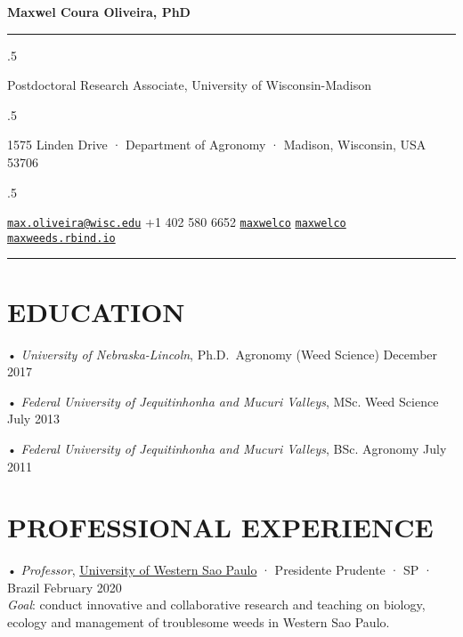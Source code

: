 \documentclass[11pt,]{article}
\begin{document}
\centerline{\huge \bf Maxwel Coura Oliveira, PhD}

\vspace{2 mm}

\hrule

\vspace{2 mm}

\moveleft.5\hoffset\centerline{Postdoctoral Research Associate, University of Wisconsin-Madison}
\moveleft.5\hoffset\centerline{1575 Linden Drive · Department of Agronomy · Madison, Wisconsin, USA
53706}
\moveleft.5\hoffset\centerline{ \faEnvelopeO \hspace{1 mm} \href{mailto:}{\tt \href{mailto:max.oliveira@wisc.edu}{\nolinkurl{max.oliveira@wisc.edu}}} \hspace{1 mm}  \faPhone \hspace{1 mm}  +1 402 580 6652  \hspace{1 mm}  \faGithub \hspace{1 mm} \href{http://github.com/maxwelco}{\tt maxwelco} \hspace{1 mm}   \faTwitter \hspace{1 mm} \href{https:/twitter.com/maxwelco}{\tt maxwelco} \hspace{1 mm}  \faGlobe \hspace{1 mm} \href{http://maxweeds.rbind.io}{\tt maxweeds.rbind.io}   }

\vspace{2 mm}

\hrule


\hypertarget{education}{%
\section{EDUCATION}\label{education}}

• \emph{University of Nebraska-Lincoln}, Ph.D.~Agronomy (Weed Science)
\hfill December 2017

• \emph{Federal University of Jequitinhonha and Mucuri Valleys}, MSc.
Weed Science \hfill July 2013

• \emph{Federal University of Jequitinhonha and Mucuri Valleys}, BSc.
Agronomy \hfill July 2011

\hypertarget{professional-experience}{%
\section{PROFESSIONAL EXPERIENCE}\label{professional-experience}}

• \emph{Professor}, \href{http://www.unoeste.br/}{University of Western
Sao Paulo} · Presidente Prudente · SP · Brazil February 2020\\
\emph{Goal}: conduct innovative and collaborative research and teaching
on biology, ecology and management of troublesome weeds in Western Sao
Paulo.
\end{document}
